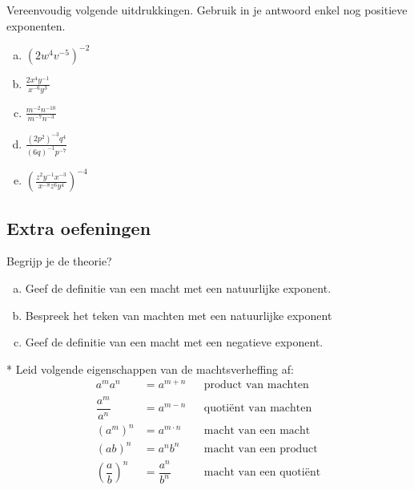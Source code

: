 \documentclass[12pt,twoside]{article}
\begin{document}
\begin{oefening}
  Vereenvoudig volgende uitdrukkingen. Gebruik in je antwoord enkel nog positieve exponenten.
  \begin{multicols}{2}
    \begin{enumerate}[(a)]
      \itemsep1em
    \item $ {\left( {2{w^4}{v^{ - 5}}} \right)^{ - 2}}  $
    \item $ \displaystyle \frac{{2{x^4}{y^{ - 1}}}}{{{x^{ - 6}}{y^3}}}  $
    \item $ \displaystyle \frac{{{m^{ - 2}}{n^{ - 10}}}}{{{m^{ - 7}}{n^{ - 3}}}}  $
    \item $ \displaystyle \frac{{{{\left( {2{p^2}} \right)}^{ - 3}}{q^4}}}{{{{\left( {6q} \right)}^{ - 1}}{p^{ - 7}}}}  $
    \item $ {\left( {\displaystyle \frac{{{z^2}{y^{ - 1}}{x^{ - 3}}}}{{{x^{ - 8}}{z^6}{y^4}}}} \right)^{ - 4}}  $
    \end{enumerate}
  \end{multicols}
\end{oefening}

\subsection{Extra oefeningen}

\begin{oefening} Begrijp je de theorie?
  \begin{enumerate}[(a)]
  \item Geef de definitie van een macht met een natuurlijke exponent.
  \item Bespreek het teken van machten met een natuurlijke exponent
  \item Geef de definitie van een macht met een negatieve exponent.
  \end{enumerate}
\end{oefening}

\begin{oefening}*
Leid volgende eigenschappen van de machtsverheffing af:
\begin{align*}
  a^m a^n &= a^{m+n} && \mbox{product van machten}\\
  \dfrac{a^m}{a^n} &= a^{m-n} && \mbox{quotiënt van machten}\\
  \left(a^m\right)^n &= a^{m\cdot n} && \mbox{macht van een macht}\\
  \left(ab\right)^n &= a^n b^n && \mbox{macht van een product}\\
  \left(\dfrac{a}{b}\right)^n &= \dfrac{a^n}{b^n} && \mbox{macht van een quotiënt}
\end{align*}
\end{oefening}
\end{document}
